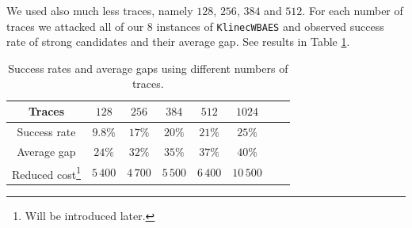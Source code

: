 	We used also much less traces, namely $128$, $256$, $384$ and $512$. For each number of traces we attacked all of our $8$ instances of {\tt KlinecWBAES} and observed success rate of strong candidates and their average gap. See results in Table \ref{tab:ntraces}.
	
	\begin{table}[h]
		\begin{center}
		\begin{tabular}{| c | c | c | c | c | c | c | c |}
			\hline
			Traces       &    $128$ &    $256$ &    $384$ &    $512$ &    $1024$ \\
			\hline
			Success rate &  $9.8\%$ &   $17\%$ &   $20\%$ &   $21\%$ &    $25\%$ \\
			\hline
			Average gap  &   $24\%$ &   $32\%$ &   $35\%$ &   $37\%$ &    $40\%$ \\
			\hline
			Reduced cost\footnote{Will be introduced later.}
			             & $5\,400$ & $4\,700$ & $5\,500$ & $6\,400$ & $10\,500$ \\
			\hline
		\end{tabular}
		\end{center}
	\caption{Success rates and average gaps using different numbers of traces.}
	\label{tab:ntraces}
	\end{table}
	
	
	
	

